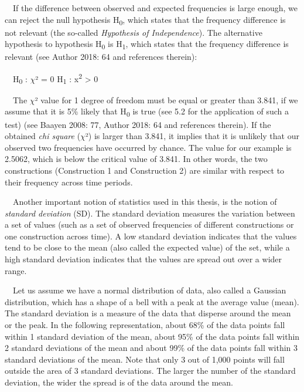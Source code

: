 \begin{styleStandard}
\ \ If the difference between observed and expected frequencies is large enough, we can reject the null hypothesis H\textsubscript{0}, which states that the frequency difference is not relevant (the so-called \textit{Hypothesis of Independence}). The alternative hypothesis to hypothesis H\textsubscript{0} is H\textsubscript{1}, which states that the frequency difference is relevant (see Author 2018: 64 and references therein): 
\end{styleStandard}

\begin{styleStandard}
\ \ H\textsubscript{0 }: $\chi $² = 0 H\textsubscript{1 }: x\textsuperscript{2 }{\textgreater} 0
\end{styleStandard}

\begin{styleStandard}
\ \ The $\chi $² value for 1 degree of freedom must be equal or greater than 3.841, if we assume that it is 5\% likely that H\textsubscript{0} is true (see 5.2 for the application of such a test) (see Baayen 2008: 77, Author 2018: 64 and references therein). If the obtained \textit{chi square} ($\chi $²) is larger than 3.841, it implies that it is unlikely that our observed two frequencies have occurred by chance. The value for our example is 2.5062, which is below the critical value of 3.841. In other words, the two constructions (Construction 1 and Construction 2) are similar with respect to their frequency across time periods. 
\end{styleStandard}

\begin{styleStandard}
\ \ Another important notion of statistics used in this thesis, is the notion of \textit{standard deviation} (SD). The standard deviation measures the variation between a set of values (such as a set of observed frequencies of different constructions or one construction across time). A low standard deviation indicates that the values tend to be close to the mean (also called the expected value) of the set, while a high standard deviation indicates that the values are spread out over a wider range.
\end{styleStandard}

\begin{styleStandard}
\ \ Let us assume we have a normal distribution of data, also called a Gaussian distribution, which has a shape of a bell with a peak at the average value (mean). The standard deviation is a measure of the data that disperse around the mean or the peak. In the following representation, about 68\% of the data points fall within 1 standard deviation of the mean, about 95\% of the data points fall within 2 standard deviations of the mean and about 99\% of the data points fall within 3 standard deviations of the mean. Note that only 3 out of 1,000 points will fall outside the area of 3 standard deviations. The larger the number of the standard deviation, the wider the spread is of the data around the mean. 
\end{styleStandard}

